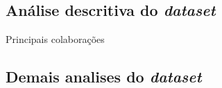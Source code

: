 \subsection{Análise descritiva do \textit{dataset}}

\begin{table}[]
    \centering
{}
    \caption{Principais colaborações}
    \label{tab:blockchains:Main}
\end{table}

\subsection{Demais analises do \textit{dataset}}